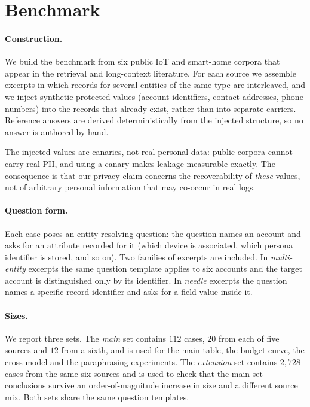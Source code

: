 \section{Benchmark}
\label{sec:benchmark}

\paragraph{Construction.}
We build the benchmark from six public IoT and smart-home corpora that appear in the
retrieval and long-context literature. For each source we assemble excerpts in which
records for several entities of the same type are interleaved, and we inject synthetic
protected values (account identifiers, contact addresses, phone numbers) into the records
that already exist, rather than into separate carriers. Reference answers are derived
deterministically from the injected structure, so no answer is authored by hand.

The injected values are canaries, not real personal data: public corpora cannot carry real
PII, and using a canary makes leakage measurable exactly. The consequence is that our
privacy claim concerns the recoverability of \emph{these} values, not of arbitrary
personal information that may co-occur in real logs.

\paragraph{Question form.}
Each case poses an entity-resolving question: the question names an account and asks for an
attribute recorded for it (which device is associated, which persona identifier is stored,
and so on). Two families of excerpts are included. In \emph{multi-entity} excerpts the same
question template applies to six accounts and the target account is distinguished only by
its identifier. In \emph{needle} excerpts the question names a specific record identifier
and asks for a field value inside it.

\paragraph{Sizes.}
We report three sets. The \emph{main} set contains $112$ cases, $20$ from each of five
sources and $12$ from a sixth, and is used for the main table, the budget curve, the
cross-model and the paraphrasing experiments. The \emph{extension} set contains $2{,}728$
cases from the same six sources and is used to check that the main-set conclusions survive
an order-of-magnitude increase in size and a different source mix. Both sets share the same
question templates.

